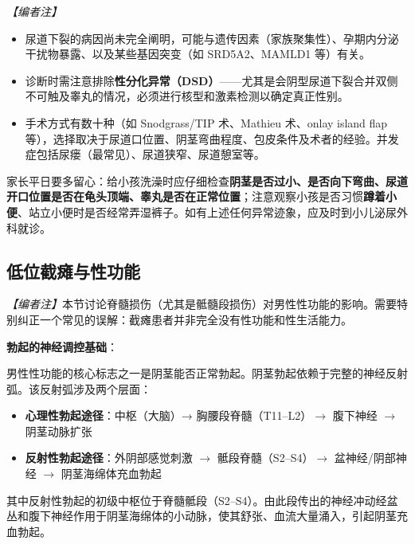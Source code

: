 \vspace{0.3em}
\noindent\textit{【编者注】}
\begin{itemize}
	\item 尿道下裂的病因尚未完全阐明，可能与遗传因素（家族聚集性）、孕期内分泌干扰物暴露、以及某些基因突变（如 SRD5A2、MAMLD1 等）有关。
	\item 诊断时需注意排除\textbf{性分化异常（DSD）}——尤其是会阴型尿道下裂合并双侧不可触及睾丸的情况，必须进行核型和激素检测以确定真正性别。
	\item 手术方式有数十种（如 Snodgrass/TIP 术、Mathieu 术、onlay island flap 等），选择取决于尿道口位置、阴茎弯曲程度、包皮条件及术者的经验。并发症包括尿瘘（最常见）、尿道狭窄、尿道憩室等。
\end{itemize}

\begin{tcolorbox}[colback=pink!5!white,colframe=red!50!black,title=贴心小叮咛]
家长平日要多留心：给小孩洗澡时应仔细检查\textbf{阴茎是否过小、是否向下弯曲、尿道开口位置是否在龟头顶端、睾丸是否在正常位置}；注意观察小孩是否习惯\textbf{蹲着小便}、站立小便时是否经常弄湿裤子。如有上述任何异常迹象，应及时到小儿泌尿外科就诊。
\end{tcolorbox}

\subsection{低位截瘫与性功能}

\noindent\textit{【编者注】}本节讨论脊髓损伤（尤其是骶髓段损伤）对男性性功能的影响。需要特别纠正一个常见的误解：截瘫患者并非完全没有性功能和性生活能力。

\vspace{0.5em}
\noindent\textbf{勃起的神经调控基础}：

男性性功能的核心标志之一是阴茎能否正常勃起。阴茎勃起依赖于完整的神经反射弧。该反射弧涉及两个层面：
\begin{itemize}
	\item \textbf{心理性勃起途径}：中枢（大脑）→ 胸腰段脊髓（T11--L2）$\rightarrow$ 腹下神经 $\rightarrow$ 阴茎动脉扩张
	\item \textbf{反射性勃起途径}：外阴部感觉刺激 $\rightarrow$ 骶段脊髓（S2--S4）$\rightarrow$ 盆神经/阴部神经 $\rightarrow$ 阴茎海绵体充血勃起
\end{itemize}

其中反射性勃起的初级中枢位于脊髓骶段（S2--S4）。由此段传出的神经冲动经盆丛和腹下神经作用于阴茎海绵体的小动脉，使其舒张、血流大量涌入，引起阴茎充血勃起。

